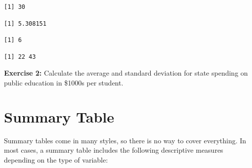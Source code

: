 \documentclass[
]{book}
\makeatletter
\newenvironment{Shaded}{\begin{snugshade}}{\end{snugshade}}
\newcommand{\FunctionTok}[1]{\textcolor[rgb]{0.27,0.27,0.27}{\textbf{#1}}}
\newcommand{\NormalTok}[1]{#1}
\newcommand{\SpecialCharTok}[1]{\textcolor[rgb]{0.43,0.43,0.43}{\textbf{#1}}}
\newenvironment{kframe}{%
\medskip{}
\setlength{\fboxsep}{.8em}
 \def\at@end@of@kframe{}%
 \ifinner\ifhmode%
  \def\at@end@of@kframe{\end{minipage}}%
  \begin{minipage}{\columnwidth}%
 \fi\fi%
 \def\FrameCommand##1{\hskip\@totalleftmargin \hskip-\fboxsep
 \colorbox{shadecolor}{##1}\hskip-\fboxsep
     \hskip-\linewidth \hskip-\@totalleftmargin \hskip\columnwidth}%
 \MakeFramed {\advance\hsize-\width
   \@totalleftmargin\z@ \linewidth\hsize
   \@setminipage}}%
 {\par\unskip\endMakeFramed%
 \at@end@of@kframe}
\renewenvironment{Shaded}{\begin{kframe}}{\end{kframe}}
\newenvironment{rmdblock}[1]
  {\begin{shaded*}
  }
  {\end{shaded*}
  }
\newenvironment{learncheck}
  {\begin{rmdblock}{warning}}
  {\end{rmdblock}}
\makeatother
\begin{document}
\begin{verbatim}
[1] 30
\end{verbatim}

\begin{Shaded}
\end{Shaded}

\begin{verbatim}
[1] 5.308151
\end{verbatim}

\begin{Shaded}
\end{Shaded}

\begin{verbatim}
[1] 6
\end{verbatim}

\begin{Shaded}
\end{Shaded}

\begin{verbatim}
[1] 22 43
\end{verbatim}

\begin{learncheck}
\textbf{Exercise 2:} Calculate the average and standard deviation for
state spending on public education in \$1000s per student.
\end{learncheck}

\hypertarget{summary-table}{%
\section{Summary Table}\label{summary-table}}

Summary tables come in many styles, so there is no way to cover everything. In most cases, a summary table includes the following descriptive measures depending on the type of variable:
\end{document}
